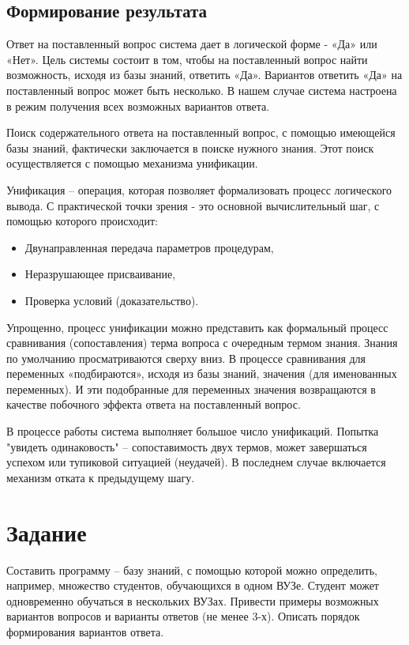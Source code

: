 \documentclass[a4paper,12pt]{article}
\begin{document}
\subsection*{Формирование результата}

Ответ на поставленный вопрос система дает в логической форме - «Да» или «Нет». Цель системы состоит в том, чтобы на поставленный вопрос найти возможность, исходя из базы знаний, ответить «Да». Вариантов ответить «Да» на поставленный вопрос может быть несколько. В нашем случае система настроена в режим получения всех возможных вариантов ответа.

Поиск содержательного ответа на поставленный вопрос, с помощью имеющейся базы знаний, фактически заключается в поиске нужного знания. Этот поиск осуществляется  с помощью механизма унификации.

Унификация – операция, которая позволяет формализовать процесс логического вывода. С практической точки зрения  - это основной вычислительный шаг, с помощью которого происходит:
\begin{itemize}
	\item Двунаправленная передача параметров процедурам,
	\item Неразрушающее присваивание,
	\item Проверка условий (доказательство).
\end{itemize}

Упрощенно, процесс унификации можно представить как формальный процесс сравнивания (сопоставления) терма вопроса с очередным термом знания. Знания по умолчанию просматриваются сверху вниз. В процессе сравнивания для переменных «подбираются», исходя из базы знаний, значения (для именованных переменных). И эти подобранные для переменных значения возвращаются в качестве побочного эффекта ответа на поставленный вопрос.

В процессе работы система выполняет большое число унификаций.  Попытка "увидеть одинаковость" – сопоставимость двух термов, может завершаться успехом или тупиковой ситуацией (неудачей). В последнем случае включается механизм отката к предыдущему шагу.


\section*{Задание}

Составить программу – базу знаний, с помощью которой можно определить, например, множество студентов, обучающихся в одном ВУЗе. Студент может одновременно обучаться в нескольких ВУЗах. Привести примеры возможных вариантов вопросов и варианты ответов (не менее 3-х). Описать порядок формирования вариантов ответа.
\end{document}
